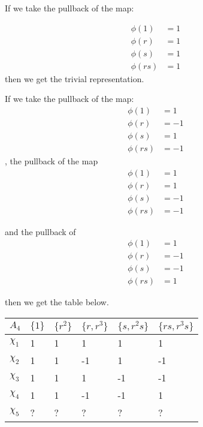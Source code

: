 \documentclass[]{article}
\begin{document}
If we take the pullback of the map:

\begin{align*}
	\phi(1) &= 1\\
	\phi(r) &= 1\\
	\phi(s) &= 1\\
	\phi(rs) &= 1
\end{align*}
then we get the trivial representation.

If we take the pullback of the map:
\begin{align*}
	\phi(1) &= 1\\
	\phi(r) &= -1\\
	\phi(s) &= 1\\
	\phi(rs) &= -1
\end{align*},
the pullback of the map
\begin{align*}
	\phi(1) &= 1\\
	\phi(r) &= 1\\
	\phi(s) &= -1\\
	\phi(rs) &= -1
\end{align*}

and the pullback of
\begin{align*}
	\phi(1) &= 1\\
	\phi(r) &= -1\\
	\phi(s) &= -1\\
	\phi(rs) &= 1
\end{align*}

then we get the table below.
\begin{table}[h!]
	\centering
	\begin{tabular}{|l|l|l|l|l|l|}
		\hline
		$A_4$    & $\{ 1 \} $ & $\{ r^2 \}$ & $ \{ r, r^3 \}$ & $\{ s, r^2 s \}$ & $\{ rs, r^3 s\}$ \\ \hline
		$\chi_1$ & 1          & 1           & 1               & 1                & 1                \\ \hline
		$\chi_2$ & 1          & 1           & -1              & 1                & -1               \\ \hline
		$\chi_3$ & 1          & 1           & 1               & -1               & -1               \\ \hline
		$\chi_4$ & 1          & 1           & -1              & -1               & 1                \\ \hline
		$\chi_5$ & ?          & ?           & ?               & ?                & ?                \\ \hline
	\end{tabular}
\end{table}
\end{document}
